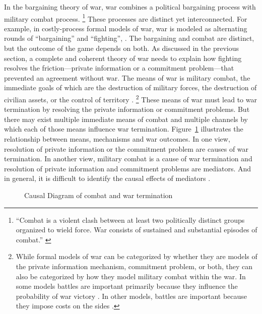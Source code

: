 In the bargaining theory of war, war combines a political bargaining process with military combat process.%
\footnote{%
  ``Combat is a violent clash between at least two politically distinct groups organized to wield force. War consists of sustained and substantial episodes of combat.'' \parencite{Reiter2003} %
} %
These processes are distinct yet interconnected. 
For example, in costly-process formal models of war, war is modeled as alternating rounds of ``bargaining'' and ``fighting'', \eg{}\textcite{Slantchev2003}.
The bargaining and combat are distinct, but the outcome of the game depends on both.
As discussed in the previous section, a complete and coherent theory of war needs to explain how fighting resolves the friction---private information or a commitment problem---that prevented an agreement without war.
The means of war is military combat, the immediate goals of which are the destruction of military forces, the destruction of civilian assets, or the control of territory \parencite[30]{Reiter2003}.%
\footnote{
While formal models of war can be categorized by whether they are models of the private information mechanism, commitment problem, or both, they can also be categorized by how they model military combat within the war.
In some models battles are important primarily because they influence the probability of war victory \parencites{Powell2004}{Wagner2000}{LeventogluSlantchev2007}{Slantchev2003}{SmithStam2004}.
In other models, battles are important because they impose costs on the sides \parencites{FilsonWerner2002}{Powell2004}{LeventogluSlantchev2007}. %
}
These means of war must lead to war termination by resolving the private information or commitment problems.
But there may exist multiple immediate means of combat and multiple channels by which each of those means influence war termination.
Figure~\ref{bonds:fig:combat-causal-diagram} illustrates the relationship between means, mechanisms and war outcomes.
In one view, resolution of private information or the commitment problem are causes of war termination.
In another view, military combat is a cause of war termination and resolution of private information and commitment problems are mediators.
And in general, it is difficult to identify the causal effects of mediators \parencite{Keele2015a}.

\begin{figure}[!htpb]
  \centering
  
  \caption{Causal Diagram of combat and war termination}
  \label{bonds:fig:combat-causal-diagram}
\end{figure}

